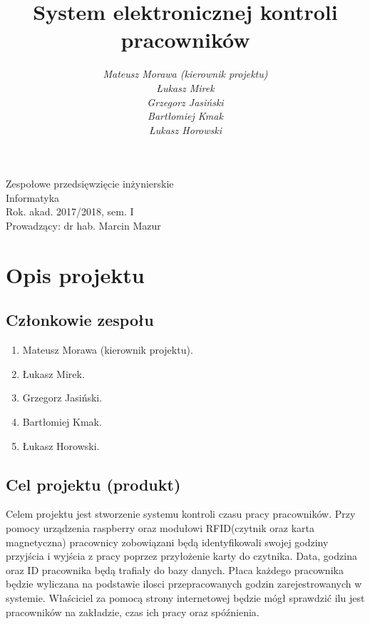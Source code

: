 \documentclass[a4paper]{article}
\title{\bf{System elektronicznej kontroli pracowników}}
\author{{\em Mateusz Morawa (kierownik projektu)}\\
{\em Łukasz Mirek}\\
{\em Grzegorz Jasiński}\\
{\em Bartłomiej Kmak}\\
{\em Łukasz Horowski}\\
}
\date{}
\begin{document}
\begin{titlepage}
\maketitle
\thispagestyle{empty}
\bigskip
\begin{center}
Zespołowe przedsięwzięcie inżynierskie\\[2mm]

Informatyka\\[2mm]

Rok. akad. 2017/2018, sem. I\\[2mm]

Prowadzący: dr hab. Marcin Mazur
\end{center}
\end{titlepage}

\tableofcontents
\thispagestyle{empty}

\newpage

\section{Opis projektu}

\subsection{Członkowie zespołu}

\begin{enumerate}
\item Mateusz Morawa (kierownik projektu).
\item Łukasz Mirek.
\item Grzegorz Jasiński.
\item Bartłomiej Kmak.
\item Łukasz Horowski.
\end{enumerate}

\subsection{Cel projektu (produkt)}

Celem projektu jest stworzenie systemu kontroli czasu pracy pracowników. Przy pomocy urządzenia raspberry oraz modułowi RFID(czytnik oraz karta magnetyczna) pracownicy zobowiązani będą identyfikowali swojej godziny przyjścia i wyjścia z pracy poprzez przyłożenie karty do czytnika. Data, godzina oraz ID pracownika będą trafiały do bazy danych. Płaca każdego pracownika będzie wyliczana na podstawie ilosci przepracowanych godzin zarejestrowanych w systemie. Właściciel za pomocą strony internetowej będzie mógł sprawdzić ilu jest  pracowników na zakładzie, czas ich pracy oraz spóźnienia.
\end{document}
